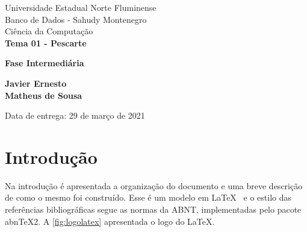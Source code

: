 \documentclass[11pt]{../../classes/ifscarticle}
\begin{document}
\begin{center}

    {\large Universidade Estadual Norte Fluminense}\\[0.2cm] %
    {\large Banco de Dados - Sahudy Montenegro}\\[0.2cm] %
    {\large Ciência da Computação}\\[5.2cm]
    

{\Huge \bfseries Tema 01 - Pescarte}

\vspace{.5cm}

{\LARGE \bfseries Fase Intermediária}

\vfill
\end{center}
\begin{tabbing}
   
\end{tabbing}

{\noindent \large \bfseries 
Javier Ernesto 
\\[.5em] Matheus de Sousa  
}


\begin{flushright}
Data de entrega: 29 de mar\c{c}o de 2021
\end{flushright}

\clearpage
\pagestyle{firstpage}

\tableofcontents
\clearpage


\section{Introdução}
\label{sec:introducao}

Na introdução é apresentada a organização do documento e uma breve descrição de como o mesmo foi construído.   Esse é um modelo em \LaTeX~ \cite{lamport94} e o estilo das referências bibliográficas segue as normas da ABNT, implementadas pelo pacote abnTeX2. A \autoref{fig:logolatex} apresentada o logo do \LaTeX.
\end{document}
